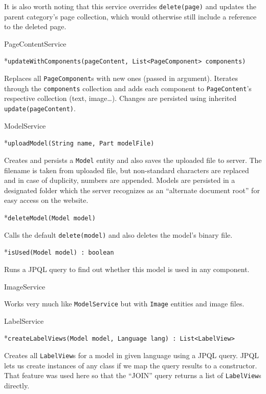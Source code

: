 \enditems

It is also worth noting that this service overrides {\tt delete(page)} and updates the parent category’s page collection, which would otherwise still include a reference to the deleted page.

\secc PageContentService

\begitems

*{\tt updateWithComponents(pageContent, List<PageComponent> components)}

Replaces all {\tt PageComponent}s with new ones (passed in argument). Iterates through the {\tt components} collection and adds each component to {\tt PageContent}’s respective collection (text, image…). Changes are persisted using inherited {\tt update(pageContent)}.

\enditems

\secc ModelService

\begitems

*{\tt uploadModel(String name, Part modelFile)}

Creates and persists a {\tt Model} entity and also saves the uploaded file to server. The filename is taken from uploaded file, but non-standard characters are replaced and in case of duplicity, numbers are appended. Models are persisted in a designated folder which the server recognizes as an “alternate document root” for easy access on the website.

*{\tt deleteModel(Model model)}

Calls the default {\tt delete(model)} and also deletes the model’s binary file.

*{\tt isUsed(Model model) : boolean}

Runs a JPQL query to find out whether this model is used in any component.

\enditems

\secc ImageService

Works very much like {\tt ModelService} but with {\tt Image} entities and image files.

\secc LabelService

\begitems

*{\tt createLabelViews(Model model, Language lang) : List<LabelView>}

Creates all {\tt LabelView}s for a model in given language using a JPQL query. JPQL lets us create instances of any class if we map the query results to a constructor. That feature was used here so that the “JOIN” query returns a list of {\tt LabelView}s directly.


